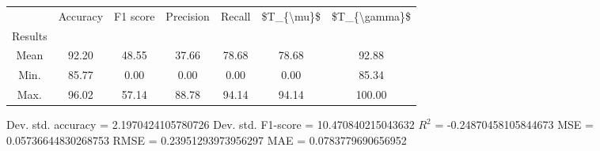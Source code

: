 \begin{tabular}{|c|c|c|c|c|c|c|}
\toprule
{} &  Accuracy &  F1 score &  Precision &  Recall &  \$T\_\{\textbackslash mu\}\$ &  \$T\_\{\textbackslash gamma\}\$ \\
Results &           &           &            &         &            &               \\
\hline
Mean    &     92.20 &     48.55 &      37.66 &   78.68 &      78.68 &         92.88 \\
Min.    &     85.77 &      0.00 &       0.00 &    0.00 &       0.00 &         85.34 \\
Max.    &     96.02 &     57.14 &      88.78 &   94.14 &      94.14 &        100.00 \\
\bottomrule
\end{tabular}

 Dev. std. accuracy = 2.1970424105780726
 Dev. std. F1-score = 10.470840215043632
 $R^2$ = -0.24870458105844673
 MSE = 0.05736644830268753
 RMSE = 0.23951293973956297
 MAE = 0.0783779690656952